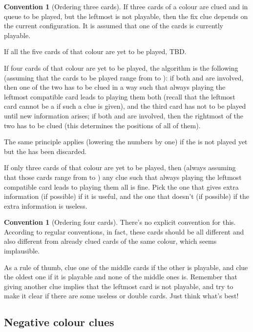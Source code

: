 \documentclass[a4paper]{article}
\theoremstyle{plain}
\theoremstyle{definition}
\newtheorem{convention}[theorem]{Convention}
\begin{document}
\begin{convention}[Ordering three cards]
	\label{ordering-three-cards}
	If three cards of a colour are clued and in queue to be played, but the leftmost is not playable, then the fix clue depends on the current configuration. It is assumed that one of the cards is currently playable.
	
	If all the five cards of that colour are yet to be played, TBD. %
	
	If four cards of that colour are yet to be played, the algorithm is the following (assuming that the cards to be played range from  to ): if both  and  are involved, then one of the two has to be clued in a way such that always playing the leftmost compatible card leads to playing them both (recall that the leftmost card cannot be a  if such a clue is given), and the third card has not to be played until new information arises; if both  and  are involved, then the rightmost of the two has to be clued (this determines the positions of all of them).
	
	The same principle applies (lowering the numbers by one) if the  is not played yet but the  has been discarded.
	
	If only three cards of that colour are yet to be played, then (always assuming that those cards range from  to ) any clue such that always playing the leftmost compatible card leads to playing them all is fine. Pick the one that gives extra information (if possible) if it is useful, and the one that doesn't (if possible) if the extra information is useless.
\end{convention}


\begin{convention}[Ordering four cards]
	There's no explicit convention for this. According to regular conventions, in fact, these cards should be all different and also different from already clued cards of the same colour, which seems implausible.
	
	As a rule of thumb, clue one of the middle cards if the other is playable, and clue the oldest one if it is playable and none of the middle ones is. Remember that giving another clue implies that the leftmost card is not playable, and try to make it clear if there are some useless or double cards. Just think what's best!
\end{convention}

\subsection{Negative colour clues}
\end{document}
